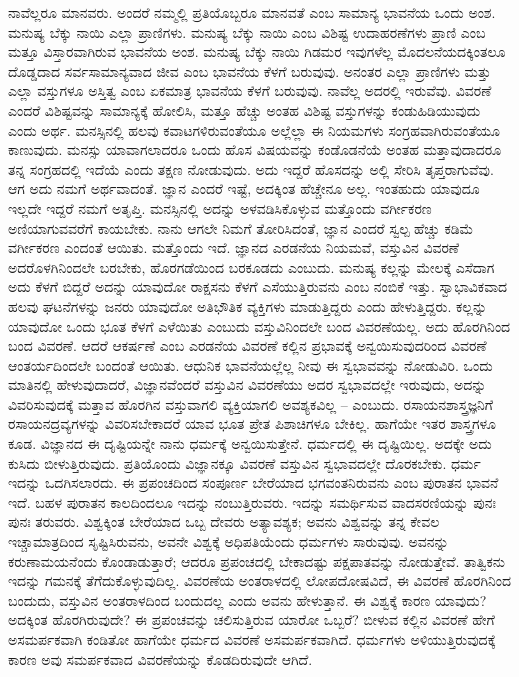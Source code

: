 ನಾವೆಲ್ಲರೂ ಮಾನವರು. ಅಂದರೆ ನಮ್ಮಲ್ಲಿ ಪ್ರತಿಯೊಬ್ಬರೂ ಮಾನವತೆ ಎಂಬ ಸಾಮಾನ್ಯ ಭಾವನೆಯ ಒಂದು ಅಂಶ. ಮನುಷ್ಯ ಬೆಕ್ಕು ನಾಯಿ ಎಲ್ಲಾ ಪ್ರಾಣಿಗಳು. ಮನುಷ್ಯ ಬೆಕ್ಕು ನಾಯಿ ಎಂಬ ವಿಶಿಷ್ಟ ಉದಾಹರಣೆಗಳು ಪ್ರಾಣಿ ಎಂಬ ಮತ್ತೂ ವಿಸ್ತಾರವಾಗಿರುವ ಭಾವನೆಯ ಅಂಶ. ಮನುಷ್ಯ ಬೆಕ್ಕು ನಾಯಿ ಗಿಡಮರ ಇವುಗಳೆಲ್ಲ ಮೊದಲನೆಯದಕ್ಕಿಂತಲೂ ದೊಡ್ಡದಾದ ಸರ್ವಸಾಮಾನ್ಯವಾದ ಜೀವ ಎಂಬ ಭಾವನೆಯ ಕೆಳಗೆ ಬರುವುವು. ಅನಂತರ ಎಲ್ಲಾ ಪ್ರಾಣಿಗಳು ಮತ್ತು ಎಲ್ಲಾ ವಸ್ತುಗಳೂ ಅಸ್ತಿತ್ವ ಎಂಬ ಏಕಮಾತ್ರ ಭಾವನೆಯ ಕೆಳಗೆ ಬರುವುವು. ನಾವೆಲ್ಲ ಅದರಲ್ಲಿ ಇರುವೆವು. ವಿವರಣೆ ಎಂದರೆ ವಿಶಿಷ್ಟವನ್ನು ಸಾಮಾನ್ಯಕ್ಕೆ ಹೋಲಿಸಿ, ಮತ್ತೂ ಹೆಚ್ಚು ಅಂತಹ ವಿಶಿಷ್ಟ ವಸ್ತುಗಳನ್ನು ಕಂಡುಹಿಡಿಯುವುದು ಎಂದು ಅರ್ಥ. ಮನಸ್ಸಿನಲ್ಲಿ ಹಲವು ಕವಾಟಗಳಿರುವಂತೆಯೂ ಅಲ್ಲೆಲ್ಲಾ ಈ ನಿಯಮಗಳು ಸಂಗ್ರಹವಾಗಿರುವಂತೆಯೂ ಕಾಣುವುದು. ಮನಸ್ಸು ಯಾವಾಗಲಾದರೂ ಒಂದು ಹೊಸ ವಿಷಯವನ್ನು ಕಂಡೊಡನೆಯೆ ಅಂತಹ ಮತ್ತಾವುದಾದರೂ ತನ್ನ ಸಂಗ್ರಹದಲ್ಲಿ ಇದೆಯೆ ಎಂದು ತಕ್ಷಣ ನೋಡುವುದು. ಅದು ಇದ್ದರೆ ಹೊಸದನ್ನು ಅಲ್ಲಿ ಸೇರಿಸಿ ತೃಪ್ತರಾಗುವೆವು. ಆಗ ಅದು ನಮಗೆ ಅರ್ಥವಾದಂತೆ. ಜ್ಞಾನ ಎಂದರೆ ಇಷ್ಟೆ, ಅದಕ್ಕಿಂತ ಹೆಚ್ಚೇನೂ ಅಲ್ಲ. ಇಂತಹುದು ಯಾವುದೂ ಇಲ್ಲದೇ ಇದ್ದರೆ ನಮಗೆ ಅತೃಪ್ತಿ. ಮನಸ್ಸಿನಲ್ಲಿ ಅದನ್ನು ಅಳವಡಿಸಿಕೊಳ್ಳುವ ಮತ್ತೊಂದು ವರ್ಗೀಕರಣ ಅಣಿಯಾಗುವವರೆಗೆ ಕಾಯಬೇಕು. ನಾನು ಆಗಲೇ ನಿಮಗೆ ತೋರಿಸಿದಂತೆ, ಜ್ಞಾನ ಎಂದರೆ ಸ್ವಲ್ಪ ಹೆಚ್ಚು ಕಡಿಮೆ ವರ್ಗೀಕರಣ ಎಂದಂತೆ ಆಯಿತು. ಮತ್ತೊಂದು ಇದೆ. ಜ್ಞಾನದ ಎರಡನೆಯ ನಿಯಮವೆ, ವಸ್ತುವಿನ ವಿವರಣೆ ಅದರೊಳಗಿನಿಂದಲೇ ಬರಬೇಕು, ಹೊರಗಡೆಯಿಂದ ಬರಕೂಡದು ಎಂಬುದು. ಮನುಷ್ಯ ಕಲ್ಲನ್ನು ಮೇಲಕ್ಕೆ ಎಸೆದಾಗ ಅದು ಕೆಳಗೆ ಬಿದ್ದರೆ ಅದನ್ನು ಯಾವುದೋ ರಾಕ್ಷಸನು ಕೆಳಗೆ ಎಸೆಯುತ್ತಿರುವನು ಎಂಬ ನಂಬಿಕೆ ಇತ್ತು. ಸ್ವಾಭಾವಿಕವಾದ ಹಲವು ಘಟನೆಗಳನ್ನು ಜನರು ಯಾವುದೋ ಅತಿಭೌತಿಕ ವ್ಯಕ್ತಿಗಳು ಮಾಡುತ್ತಿದ್ದರು ಎಂದು ಹೇಳುತ್ತಿದ್ದರು. ಕಲ್ಲನ್ನು ಯಾವುದೋ ಒಂದು ಭೂತ ಕೆಳಗೆ ಎಳೆಯಿತು ಎಂಬುದು ವಸ್ತುವಿನಿಂದಲೇ ಬಂದ ವಿವರಣೆಯಲ್ಲ. ಅದು ಹೊರಗಿನಿಂದ ಬಂದ ವಿವರಣೆ. ಆದರೆ ಆಕರ್ಷಣೆ ಎಂಬ ಎರಡನೆಯ ವಿವರಣೆ ಕಲ್ಲಿನ ಪ್ರಭಾವಕ್ಕೆ ಅನ್ವಯಿಸುವುದರಿಂದ ವಿವರಣೆ ಆಂತರ್ಯದಿಂದಲೇ ಬಂದಂತೆ ಆಯಿತು. ಆಧುನಿಕ ಭಾವನೆಯಲ್ಲೆಲ್ಲ ನೀವು ಈ ಸ್ವಭಾವವನ್ನು ನೋಡುವಿರಿ. ಒಂದು ಮಾತಿನಲ್ಲಿ ಹೇಳುವುದಾದರೆ, ವಿಜ್ಞಾನವೆಂದರೆ ವಸ್ತುವಿನ ವಿವರಣೆಯು ಅದರ ಸ್ವಭಾವದಲ್ಲೇ ಇರುವುದು, ಅದನ್ನು ವಿವರಿಸುವುದಕ್ಕೆ ಮತ್ತಾವ ಹೊರಗಿನ ವಸ್ತುವಾಗಲಿ ವ್ಯಕ್ತಿಯಾಗಲಿ ಅವಶ್ಯಕವಿಲ್ಲ – ಎಂಬುದು. ರಸಾಯನಶಾಸ್ತ್ರಜ್ಞನಿಗೆ ರಸಾಯನದ್ರವ್ಯಗಳನ್ನು ವಿವರಿಸಬೇಕಾದರೆ ಯಾವ ಭೂತ ಪ್ರೇತ ಪಿಶಾಚಿಗಳೂ ಬೇಕಿಲ್ಲ. ಹಾಗೆಯೇ ಇತರ ಶಾಸ್ತ್ರಗಳೂ ಕೂಡ. ವಿಜ್ಞಾನದ ಈ ದೃಷ್ಟಿಯನ್ನೇ ನಾನು ಧರ್ಮಕ್ಕೆ ಅನ್ವಯಿಸುತ್ತೇನೆ. ಧರ್ಮದಲ್ಲಿ ಈ ದೃಷ್ಟಿಯಿಲ್ಲ. ಅದಕ್ಕೇ ಅದು ಕುಸಿದು ಬೀಳುತ್ತಿರುವುದು. ಪ್ರತಿಯೊಂದು ವಿಜ್ಞಾನಕ್ಕೂ ವಿವರಣೆ ವಸ್ತುವಿನ ಸ್ವಭಾವದಲ್ಲೇ ದೊರಕಬೇಕು. ಧರ್ಮ ಇದನ್ನು ಒದಗಿಸಲಾರದು. ಈ ಪ್ರಪಂಚದಿಂದ ಸಂಪೂರ್ಣ ಬೇರೆಯಾದ ಭಗವಂತನಿರುವನು ಎಂಬ ಪುರಾತನ ಭಾವನೆ ಇದೆ. ಬಹಳ ಪುರಾತನ ಕಾಲದಿಂದಲೂ ಇದನ್ನು ನಂಬುತ್ತಿರುವರು. ಇದನ್ನು ಸಮರ್ಥಿಸುವ ವಾದಸರಣಿಯನ್ನು ಪುನಃ ಪುನಃ ತರುವರು. ವಿಶ್ವಕ್ಕಿಂತ ಬೇರೆಯಾದ ಒಬ್ಬ ದೇವರು ಅತ್ಯಾವಶ್ಯಕ; ಅವನು ವಿಶ್ವವನ್ನು ತನ್ನ ಕೇವಲ ಇಚ್ಚಾಮಾತ್ರದಿಂದ ಸೃಷ್ಟಿಸಿರುವನು, ಅವನೇ ವಿಶ್ವಕ್ಕೆ ಅಧಿಪತಿಯೆಂದು ಧರ್ಮಗಳು ಸಾರುವುವು. ಅವನನ್ನು ಕರುಣಾಮಯನೆಂದು ಕೊಂಡಾಡುತ್ತಾರೆ; ಆದರೂ ಪ್ರಪಂಚದಲ್ಲಿ ಬೇಕಾದಷ್ಟು ಪಕ್ಷಪಾತವನ್ನು ನೋಡುತ್ತೇವೆ. ತಾತ್ವಿಕನು ಇದನ್ನು ಗಮನಕ್ಕೆ ತೆಗೆದುಕೊಳ್ಳುವುದಿಲ್ಲ. ವಿವರಣೆಯ ಅಂತರಾಳದಲ್ಲಿ ಲೋಪದೋಷವಿದೆ, ಈ ವಿವರಣೆ ಹೊರಗಿನಿಂದ ಬಂದುದು, ವಸ್ತುವಿನ ಅಂತರಾಳದಿಂದ ಬಂದುದಲ್ಲ ಎಂದು ಅವನು ಹೇಳುತ್ತಾನೆ. ಈ ವಿಶ್ವಕ್ಕೆ ಕಾರಣ ಯಾವುದು? ಅದಕ್ಕಿಂತ ಹೊರಗಿರುವುದೇ? ಈ ಪ್ರಪಂಚವನ್ನು ಚಲಿಸುತ್ತಿರುವ ಯಾರೋ ಒಬ್ಬರೆ? ಬೀಳುವ ಕಲ್ಲಿನ ವಿವರಣೆ ಹೇಗೆ ಅಸಮರ್ಪಕವಾಗಿ ಕಂಡಿತೋ ಹಾಗೆಯೇ ಧರ್ಮದ ವಿವರಣೆ ಅಸಮರ್ಪಕವಾಗಿದೆ. ಧರ್ಮಗಳು ಅಳಿಯುತ್ತಿರುವುದಕ್ಕೆ ಕಾರಣ ಅವು ಸಮರ್ಪಕವಾದ ವಿವರಣೆಯನ್ನು ಕೊಡದಿರುವುದೇ ಆಗಿದೆ.

